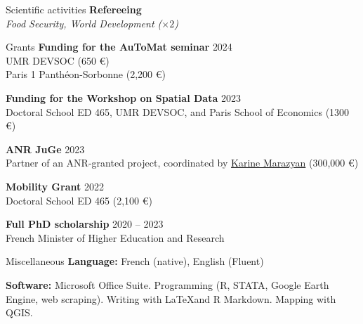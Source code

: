 \documentclass[
]{resume}
\begin{document}
\begin{small}
\begin{rSection}{Scientific activities}
\textbf{Refereeing}\\
\textit{Food Security, World Development ($\times 2$)}
\end{rSection}
\vspace{0.2cm}

\begin{rSection}{Grants}
\textbf{Funding for the AuToMat seminar} \hfill{2024}\\
UMR DEVSOC (650 \euro) \\
Paris 1 Panthéon-Sorbonne (2,200 \euro)
\vspace{0.125cm}

\textbf{Funding for the Workshop on Spatial Data} \hfill{2023}\\
Doctoral School ED 465, UMR DEVSOC, and Paris School of Economics (1300 \euro)

\textbf{ANR JuGe} \hfill{2023}\\
Partner of an ANR-granted project, coordinated by \href{https://scholar.google.com/citations?user=mImSYc4AAAAJ\&hl=fr\&oi=ao}{Karine Marazyan} (300,000 \euro)
\vspace{0.125cm}

\textbf{Mobility Grant} \hfill{2022}\\
Doctoral School ED 465 (2,100 \euro)
\vspace{0.125cm}

\textbf{Full PhD scholarship} \hfill{2020 – 2023}\\
French Minister of Higher Education and Research  
\end{rSection}
\vspace{0.2cm}

\begin{rSection}{Miscellaneous}
\textbf{Language:} French (native), English (Fluent)
\vspace{0.125cm}

\textbf{Software:} Microsoft Office Suite. Programming (R, STATA, Google Earth Engine, web scraping). Writing with \LaTeX and R Markdown. Mapping with QGIS.
\end{rSection}
\end{small}
\end{document}
